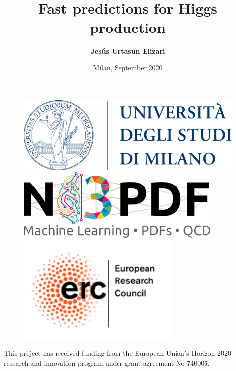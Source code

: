 \documentclass[aspectratio=43]{beamer}
\title[Fast predictions for Higgs production]{Fast predictions for Higgs production}
\author{\textbf {Jes\'us Urtasun Elizari}}
\date{Milan, September 2020}
\begin{document}
\begin{frame}

	\vspace{1.0 cm}
	
	
	\vspace{0.25 cm}

	\begin{figure}
		\includegraphics[width = 3.0 cm]{plots/unimi.png}
		\hfill
		\includegraphics[width = 3.0 cm]{plots/n3pdf.png}
		\hfill
		\includegraphics[width = 3.0 cm]{plots/erc.png}
		\endminipage
	\end{figure}

	\vspace{1.0 cm}
	
	{\scriptsize \color{blue} This project has received funding from the European Union$'$s Horizon 2020 research and innovation program under grant agreement No 740006.}

\end{frame}
\end{document}
